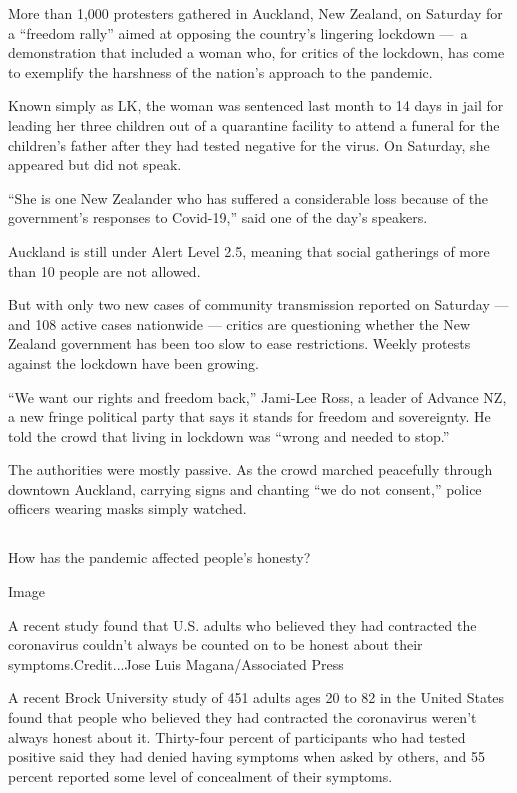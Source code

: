 More than 1,000 protesters gathered in Auckland, New Zealand, on
Saturday for a ``freedom rally'' aimed at opposing the country's
lingering lockdown ---~a demonstration that included a woman who, for
critics of the lockdown, has come to exemplify the harshness of the
nation's approach to the pandemic.

Known simply as LK, the woman was sentenced last month to 14 days in
jail for leading her three children out of a quarantine facility to
attend a funeral for the children's father after they had tested
negative for the virus. On Saturday, she appeared but did not speak.

``She is one New Zealander who has suffered a considerable loss because
of the government's responses to Covid-19,'' said one of the day's
speakers.

Auckland is still under Alert Level 2.5, meaning that social gatherings
of more than 10 people are not allowed.

But with only two new cases of community transmission reported on
Saturday --- and 108 active cases nationwide --- critics are questioning
whether the New Zealand government has been too slow to ease
restrictions. Weekly protests against the lockdown have been growing.

``We want our rights and freedom back,'' Jami-Lee Ross, a leader of
Advance NZ, a new fringe political party that says it stands for freedom
and sovereignty. He told the crowd that living in lockdown was ``wrong
and needed to stop.''

The authorities were mostly passive. As the crowd marched peacefully
through downtown Auckland, carrying signs and chanting ``we do not
consent,'' police officers wearing masks simply watched.

\hypertarget{-5}{%
\subsection{}\label{-5}}

How has the pandemic affected people's honesty?

Image

A recent study found that U.S. adults who believed they had contracted
the coronavirus couldn't always be counted on to be honest about their
symptoms.Credit...Jose Luis Magana/Associated Press

A recent Brock University study of 451 adults ages 20 to 82 in the
United States found that people who believed they had contracted the
coronavirus weren't always honest about it. Thirty-four percent of
participants who had tested positive said they had denied having
symptoms when asked by others, and 55 percent reported some level of
concealment of their symptoms.

